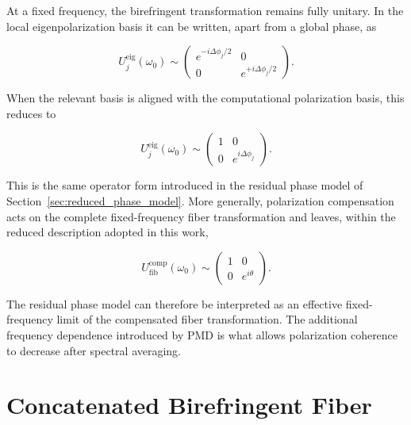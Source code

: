 At a fixed frequency, the birefringent transformation remains fully unitary. In
the local eigenpolarization basis it can be written, apart from a global phase,
as

\begin{equation}
U_j^{\mathrm{eig}}(\omega_0)
\sim
\begin{pmatrix}
e^{-i\Delta\phi_j/2} & 0\\
0 & e^{+i\Delta\phi_j/2}
\end{pmatrix}.
\label{eq:fixed_frequency_eigenbasis_operator}
\end{equation}

When the relevant basis is aligned with the computational polarization basis,
this reduces to

\begin{equation}
U_j^{\mathrm{eig}}(\omega_0)
\sim
\begin{pmatrix}
1 & 0\\
0 & e^{i\Delta\phi_j}
\end{pmatrix}.
\label{eq:fixed_frequency_reduced_phase_form}
\end{equation}

This is the same operator form introduced in the residual phase model of
Section~\ref{sec:reduced_phase_model}. More generally, polarization compensation
acts on the complete fixed-frequency fiber transformation and leaves, within the
reduced description adopted in this work,

\begin{equation}
U_{\mathrm{fib}}^{\mathrm{comp}}(\omega_0)
\sim
\begin{pmatrix}
1 & 0\\
0 & e^{i\theta}
\end{pmatrix}.
\label{eq:compensated_complete_fiber_reduced_operator}
\end{equation}

The residual phase model can therefore be interpreted as an effective
fixed-frequency limit of the compensated fiber transformation. The additional
frequency dependence introduced by PMD is what allows polarization coherence to
decrease after spectral averaging.



\section{Concatenated Birefringent Fiber}
\label{sec:concatenated_birefringent_fiber}

